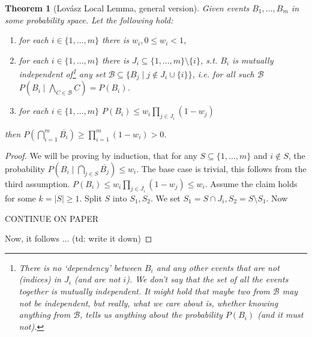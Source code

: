 \documentclass{article}
\theoremstyle{plain}
\newtheorem{thm}{Theorem}[section]
\theoremstyle{definition}
\begin{document}
\begin{thm}[Lovász Local Lemma, general version]
	Given events $B_1,\ldots, B_m$ in some probability space. Let the following hold:
	\begin{enumerate}
		\item for each $i\in\{1,\ldots, m\}$ there is $w_i,0\leq w_i<1$,
		\item for each $i\in\{1,\ldots, m\}$ there is $J_i\subseteq \{1,\ldots, m\}\setminus \{i\}$, s.t. $B_i$ is mutually independent of\footnote{There is no `dependency' between $B_i$ and any other events that are not (indices) in $J_i$ (and are not $i$). We don't say that the set of all the events together is mutually independent. It might hold that maybe two from $\mathcal{B}$ may not be independent, but really, what we care about is, whether knowing anything from $\mathcal{B}$, tells us anything about the probability $P(B_i)$ (and it must not).} any set $\mathcal{B}\subseteq \{B_j \mid j\notin J_i\cup\{i\}\}$, i.e. for all such $\mathcal{B}$ $P(B_i\mid \bigwedge_{C\in\mathcal{B}}C)=P(B_i)$.
		\item for each $i\in\{1,\ldots,m\}$ $P(B_i)\leq w_i\prod_{j\in J_i}(1-w_j)$
	\end{enumerate}
	then $P(\bigcap_{i=1}^m\overline{B_i})\geq \prod_{i=1}^m(1-w_i)>0$.
\end{thm}

\begin{proof}
	We will be proving by induction, that for any $S\subseteq \{1,\ldots,m\}$ and $i\notin S$, the probability $P(B_i\mid \bigcap_{j\in S}\overline{B_j})\leq w_i$. The base case is trivial, this follows from the third assumption. $P(B_i)\leq w_i\prod_{j\in J_i}(1-w_j)\leq w_i$. Assume the claim holds for some $k=|S|\geq 1$. Split $S$ into $S_1,S_2$. We set $S_1=S\cap J_i,S_2=S\setminus S_1$. Now 
	
	CONTINUE ON PAPER
	
	
	
	Now, it follows ... (td: write it down)
	
\end{proof}
\end{document}
